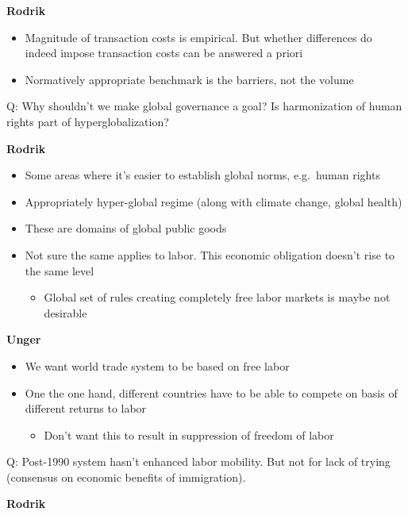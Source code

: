 \textbf{Rodrik}

\begin{itemize}
\tightlist
\item
  Magnitude of transaction costs is empirical. But whether differences
  do indeed impose transaction costs can be answered a priori
\item
  Normatively appropriate benchmark is the barriers, not the volume
\end{itemize}

Q: Why shouldn't we make global governance a goal? Is harmonization of
human rights part of hyperglobalization?

\textbf{Rodrik}

\begin{itemize}
\tightlist
\item
  Some areas where it's easier to establish global norms, e.g.~human
  rights
\item
  Appropriately hyper-global regime (along with climate change, global
  health)
\item
  These are domains of global public goods
\item
  Not sure the same applies to labor. This economic obligation doesn't
  rise to the same level

  \begin{itemize}
  \tightlist
  \item
    Global set of rules creating completely free labor markets is maybe
    not desirable
  \end{itemize}
\end{itemize}

\textbf{Unger}

\begin{itemize}
\tightlist
\item
  We want world trade system to be based on free labor
\item
  One the one hand, different countries have to be able to compete on
  basis of different returns to labor

  \begin{itemize}
  \tightlist
  \item
    Don't want this to result in suppression of freedom of labor
  \end{itemize}
\end{itemize}

Q: Post-1990 system hasn't enhanced labor mobility. But not for lack of
trying (consensus on economic benefits of immigration).

\textbf{Rodrik}

